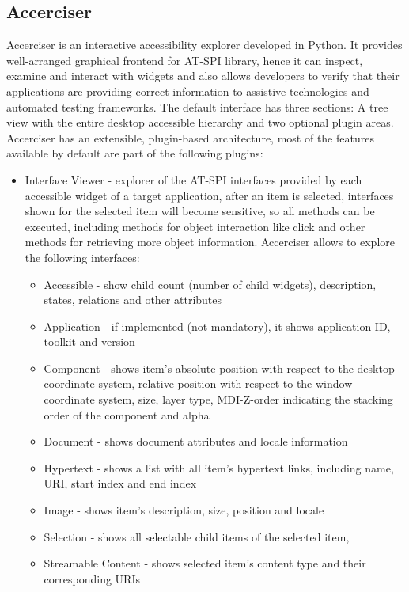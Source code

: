 \subsection{Accerciser}
Accerciser is an interactive accessibility explorer developed in Python. It provides well-arranged graphical frontend for AT-SPI library, hence it can inspect, examine and interact with widgets and also allows developers to verify that their applications are providing correct information to assistive technologies and automated testing frameworks. The default interface has three sections: A tree view with the entire desktop accessible hierarchy and two optional plugin areas. Accerciser has an extensible, plugin-based architecture, most of the features available by default are part of the following plugins: 

\begin{itemize}
    \item Interface Viewer - explorer of the AT-SPI interfaces provided by each accessible widget of a target application, after an item is selected, interfaces shown for the selected item will become sensitive, so all methods can be executed, including methods for object interaction like click and other methods for retrieving more object information. Accerciser allows to explore the following interfaces:
    \begin{itemize}
        \item Accessible - show child count (number of child widgets), description, states, relations and other attributes
        \item Application - if implemented (not mandatory), it shows application ID, toolkit and version
        \item Component - shows item's absolute position with respect to the desktop coordinate system, relative position with respect to the  window coordinate system, size, layer type, MDI-Z-order indicating the stacking order of the component and alpha
        \item Document - shows document attributes and locale information
        \item Hypertext - shows a list with all item's hypertext links,  including name, URI, start index and end index
        \item Image - shows item's description, size, position and locale
        \item Selection - shows all selectable child items of the selected item,
        \item Streamable Content - shows selected item's content type and their corresponding URIs

\end{itemize}
\end{itemize}
